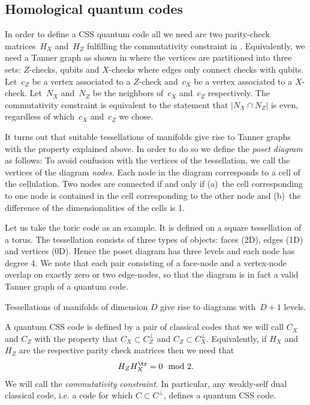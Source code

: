	
	
	
	
	
	
\subsection{Homological quantum codes}
In order to define a CSS quantum code all we need are two parity-check matrices~$H_X$ and~$H_Z$ fulfilling the commutativity constraint in .
Equivalently, we need a Tanner graph as shown in  where the vertices are partitioned into three sets: $Z$-checks, qubits and $X$-checks where edges only connect checks with qubits.
Let~$c_Z$ be a vertex associated to a $Z$-check and~$c_X$ be a vertex associated to a $X$-check.
Let~$N_X$ and~$N_Z$ be the neighbors of~$c_X$ and~$c_Z$ respectively.
The commutativity constraint is equivalent to the statement that $| N_X \cap N_Z |$ is even, regardless of which~$c_X$ and~$c_Z$ we chose.

It turns out that suitable tessellations of manifolds give rise to Tanner graphs with the property explained above.
In order to do so we define the \emph{poset diagram} as follows:
To avoid confusion with the vertices of the tessellation, we call the vertices of the diagram \emph{nodes}.
Each node in the diagram corresponds to a cell of the cellulation. 
Two nodes are connected if and only if (a)~the cell corresponding to one node is contained in the cell corresponding to the other node and (b)~the difference of the dimensionalities of the cells is 1.

Let us take the toric code as an example.
It is defined on a square tessellation of a torus.
The tessellation consists of three types of objects: faces (2D), edges (1D) and vertices (0D).
Hence the poset diagram has three levels and each node has degree 4.
We note that each pair consisting of a face-node and a vertex-node overlap on exactly zero or two edge-nodes, so that the diagram is in fact a valid Tanner graph of a quantum code.

Tessellations of manifolds of dimension $D$ give rise to diagrams with~$D+1$ levels.

A quantum CSS code is defined by a pair of classical codes that we will call $C_X$ and $C_Z$ with the property that $C_X \subset C_Z^\perp$ and $C_Z \subset C_X^\perp$.
Equivalently, if $H_X$ and $H_Z$ are the respective parity check matrices then we need that
\begin{align}\label{eqn:CSS_commutativity_constraint}
H_Z H_X^{\tr} = 0 \mod 2.
\end{align}
We will call  the \emph{commutativity constraint}.
In particular, any weakly-self dual classical code, i.e. a code for which $C \subset C^{\perp}$, defines a quantum CSS code.

